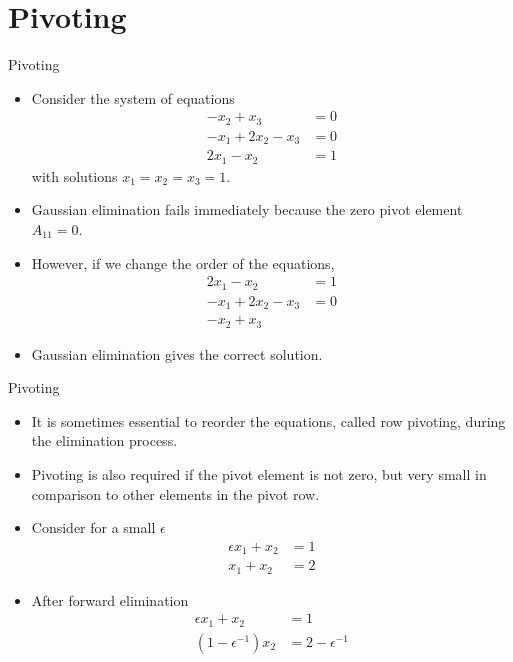 \documentclass{beamer}
\newcommand{\beforeverb}{\footnotesize}
\newcommand{\afterverb}{\normalsize}
\begin{document}
\section[Pivoting]{Pivoting}
\begin{frame}{Pivoting}
\begin{itemize}
\item  Consider the system of equations
\beforeverb
\begin{align*}
-x_2+x_3&=0\\
-x_1+2x_2-x_3&=0\\
2x_1-x_2&=1
\end{align*}
\afterverb
with solutions $x_1=x_2=x_3=1$.
\item Gaussian elimination \alert{fails} immediately because the zero pivot element $A_{11}=0$.
\item However, if we \alert{change the order of the equations},
\beforeverb
\begin{align*}
2x_1-x_2&=1\\
-x_1+2x_2-x_3&=0\\
-x_2+x_3
\end{align*} 
\afterverb
\item Gaussian elimination gives the correct solution.

\end{itemize}
\afterverb
\end{frame}
\begin{frame}{Pivoting}
\begin{itemize}
\item It is sometimes essential to \alert{reorder the equations}, called \alert{row pivoting}, during the elimination process. 
\item Pivoting is also required if the pivot element is \alert{not zero}, but very \alert{small} in comparison to other elements in the pivot row.
\item Consider for a small $\epsilon$
\begin{align*}
\epsilon x_1+x_2&=1\\
x_1+x_2&=2
\end{align*}
\afterverb
\item After forward elimination
\begin{align*}
\epsilon x_1+x_2&=1\\
(1-\epsilon ^{-1}) x_2&=2-\epsilon^{-1}
\end{align*}
\afterverb

\end{itemize}

\end{frame}
\end{document}
